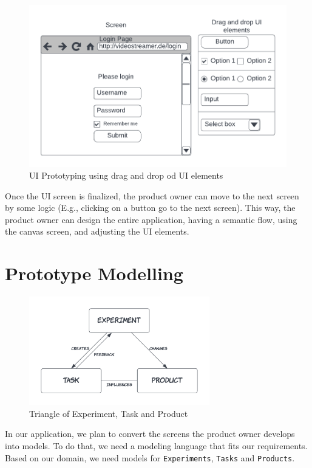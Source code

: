 \begin{figure}[h]
    \centering
    \includegraphics[scale=0.4]{images/solution-ideas/UIPrototyping.png}
    \caption{UI Prototyping using drag and drop od UI elements}
    \label{solutionideas:fig:uiprototyping}
\end{figure}

Once the UI screen is finalized, the product owner can move to the next screen by some logic (E.g., clicking on a button go to the next screen). 
This way, the product owner can design the entire application, having a semantic flow, using the canvas screen, and adjusting the UI elements. 

\section{Prototype Modelling}
\begin{figure}[ht]
	\centering
  \includegraphics[width=0.7\textwidth]{images/solution-ideas/Triangle.png}
	\caption{Triangle of Experiment, Task and Product}
	\label{solutionideas:fig:triangle}
\end{figure}
 
In our application, we plan to convert the screens the product owner develops into models. 
To do that, we need a modeling language that fits our requirements. Based on our domain, we need models for \texttt{Experiments}, \texttt{Tasks} and \texttt{Products}.
